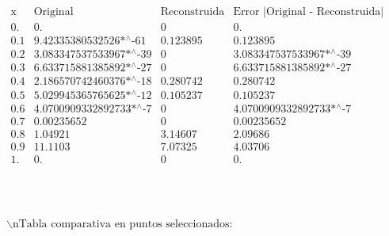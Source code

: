 \documentclass{article}
\begin{document}
\noindent\(\begin{array}{cccc}
 \text{x} & \text{Original} & \text{Reconstruida} & \text{Error $|$Original - Reconstruida$|$} \\
 0. & 0. & 0 & 0. \\
 0.1 & \text{9.42335380532526$\grave{ }$*${}^{\wedge}$-61} & 0.123895 & 0.123895 \\
 0.2 & \text{3.083347537533967$\grave{ }$*${}^{\wedge}$-39} & 0 & \text{3.083347537533967$\grave{ }$*${}^{\wedge}$-39} \\
 0.3 & \text{6.633715881385892$\grave{ }$*${}^{\wedge}$-27} & 0 & \text{6.633715881385892$\grave{ }$*${}^{\wedge}$-27} \\
 0.4 & \text{2.186570742460376$\grave{ }$*${}^{\wedge}$-18} & 0.280742 & 0.280742 \\
 0.5 & \text{5.029945365765625$\grave{ }$*${}^{\wedge}$-12} & 0.105237 & 0.105237 \\
 0.6 & \text{4.0700909332892733$\grave{ }$*${}^{\wedge}$-7} & 0 & \text{4.0700909332892733$\grave{ }$*${}^{\wedge}$-7} \\
 0.7 & 0.00235652 & 0 & 0.00235652 \\
 0.8 & 1.04921 & 3.14607 & 2.09686 \\
 0.9 & 11.1103 & 7.07325 & 4.03706 \\
 1. & 0. & 0 & 0. \\
\end{array}\)

\noindent\(\begin{array}{cc}
 
\begin{array}{cc}
  &  \\
\end{array}
 &  \\
\end{array}\)

\noindent\(\text{$\backslash $nTabla comparativa en puntos seleccionados:}\)
\end{document}
